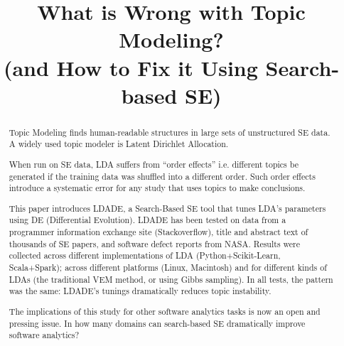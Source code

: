 \documentclass[10pt,conference]{IEEEtran}
\theoremstyle{break}
\begin{document}
\pagestyle{plain}

\title{What is  Wrong with
Topic Modeling?\\ (and How to Fix it Using Search-based SE)}


\author{
\and
{}
\and
{}
}

\maketitle


\begin{abstract}
  Topic Modeling finds
  human-readable structures in large sets of unstructured SE data.
  A widely used topic modeler is Latent Dirichlet Allocation.

 When run on SE data, LDA suffers
 from ``order effects'' i.e. 
 different topics be generated if the training data was shuffled into a different order.
Such order effects introduce a systematic error for any study that uses
topics to make  conclusions.

This paper introduces LDADE, a 
Search-Based SE tool that tunes LDA's parameters using DE 
(Differential Evolution). 
LDADE has  been tested on  data from a programmer
information exchange site (Stackoverflow), title and abstract text of thousands
of SE papers, and software defect reports from NASA.  Results were collected
across different implementations of LDA (Python+Scikit-Learn, Scala+Spark); across
different platforms (Linux, Macintosh) and for different kinds of LDAs (the
traditional VEM method, or using Gibbs sampling). In all tests, the pattern was
the same: LDADE's tunings dramatically reduces topic instability.
  
The implications of this study for other software analytics tasks is now an open
and pressing issue. 
In how many domains can search-based SE dramatically improve software analytics?

\end{abstract}
\end{document}
